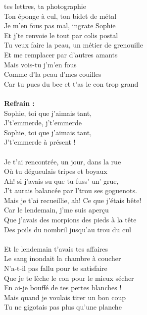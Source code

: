 
 tes lettres, ta photographie
\\Ton éponge à cul, ton bidet de métal
\\Je m'en fous pas mal, ingrate Sophie
\\Et j'te renvoie le tout par colis postal
\\Tu veux faire la peau, un métier de grenouille
\\Et me remplacer par d'autres amants
\\Mais vois-tu j'm'en fous
\\Comme d'la peau d'mes couilles
\\Car tu pues du bec et t'as le con trop grand
\\\\\textbf{Refrain :}
\\Sophie, toi que j'aimais tant,
\\J't'emmerde, j't'emmerde
\\Sophie, toi que j'aimais tant,
\\J't'emmerde à présent !
\\\\Je t'ai rencontrée, un jour, dans la rue
\\Où tu dégueulais tripes et boyaux
\\Ah! si j'avais su que tu fuss' un' grue,
\\J't aurais balancée par l'trou ses goguenots.
\\Mais je t'ai recueillie, ah! Ce que j'étais bête!
\\Car le lendemain, j'me suis aperçu
\\Que j'avais des morpions des pieds à la tête
\\Des poils du nombril jusqu'au trou du cul
\\\\Et le lendemain t'avais tes affaires
\\Le sang inondait la chambre à coucher
\\N'a-t-il pas fallu pour te satisfaire
\\Que je te lèche le con pour le mieux sécher
\\En ai-je bouffé de tes pertes blanches !
\\Mais quand je voulais tirer un bon coup
\\Tu ne gigotais pas plus qu'une planche
